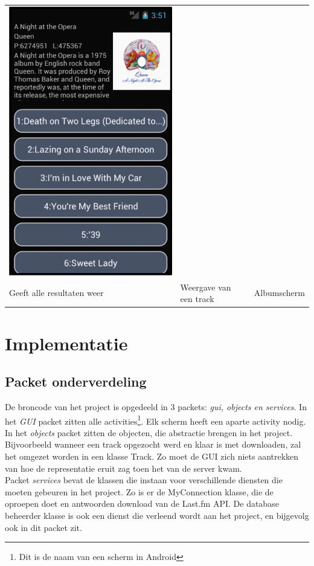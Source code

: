 \documentclass[11pt,a4paper]{article}
\begin{document}
\begin{tabular}{l l l}
	\includegraphics[scale=0.4]{GUI_0124_album.png} \\
	Geeft alle resultaten weer & Weergave van een track & Albumscherm \\
	
	\end{tabular}
	
\section{Implementatie}
	\subsection{Packet onderverdeling}
		\normalsize De broncode van het project is opgedeeld in 3 packets: \textit{gui, objects en services}. In het \textit{GUI} packet zitten alle activities\footnote{Dit is de naam van een scherm in Android}. Elk scherm heeft een aparte activity nodig. \\
		In het \textit{objects} packet zitten de objecten, die abstractie brengen in het project. Bijvoorbeeld wanneer een track opgezocht werd en klaar is met downloaden, zal het omgezet worden in een klasse Track. Zo moet de GUI zich niets aantrekken van hoe de representatie eruit zag toen het van de server kwam. \\
		Packet \textit{services} bevat de klassen die instaan voor verschillende diensten die moeten gebeuren in het project. Zo is er de MyConnection klasse, die de oproepen doet en antwoorden download van de Last.fm API. De database beheerder klasse is ook een dienst die verleend wordt aan het project, en bijgevolg ook in dit packet zit.
\end{document}
